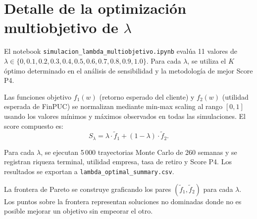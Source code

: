\section{Detalle de la optimizaci\'on multiobjetivo de $\lambda$}

El notebook \texttt{simulacion\_lambda\_multiobjetivo.ipynb} eval\'ua
11 valores de $\lambda \in \{0, 0.1, 0.2, 0.3, 0.4, 0.5, 0.6, 0.7, 0.8,
0.9, 1.0\}$. Para cada $\lambda$, se utiliza el $K$ \'optimo determinado en
el an\'alisis de sensibilidad y la metodolog\'ia de mejor Score P4.

Las funciones objetivo $f_1(w)$ (retorno esperado del cliente) y $f_2(w)$
(utilidad esperada de FinPUC) se normalizan mediante min-max scaling al rango
$[0,1]$ usando los valores m\'inimos y m\'aximos observados en todas las
simulaciones. El score compuesto es:
\begin{equation}
S_\lambda = \lambda \cdot \tilde{f}_1 + (1-\lambda) \cdot \tilde{f}_2.
\end{equation}

Para cada $\lambda$, se ejecutan 5\,000 trayectorias Monte Carlo de 260
semanas y se registran riqueza terminal, utilidad empresa, tasa de retiro y
Score P4. Los resultados se exportan a \texttt{lambda\_optimal\_summary.csv}.

La frontera de Pareto se construye graficando los pares
$(\tilde{f}_1, \tilde{f}_2)$ para cada $\lambda$. Los puntos sobre la frontera
representan soluciones no dominadas donde no es posible mejorar un objetivo
sin empeorar el otro.
